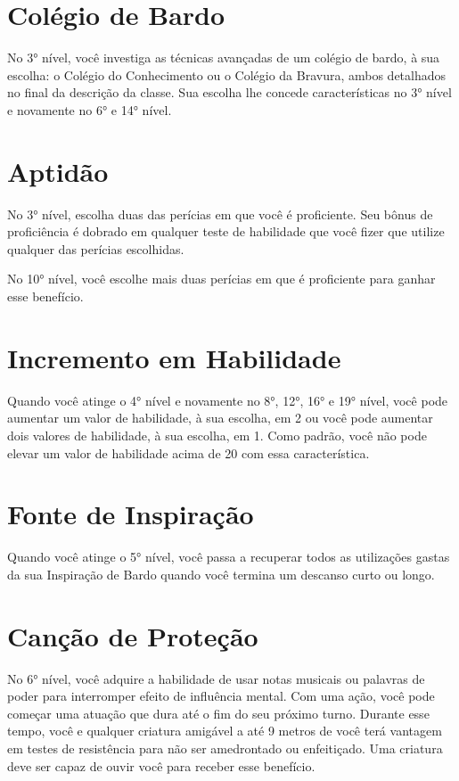 \begin{multicols}{2}
\section*{Colégio de Bardo}%

No 3° nível, você investiga as técnicas avançadas de um colégio de bardo, à sua
escolha: o Colégio do Conhecimento ou o Colégio da Bravura, ambos detalhados no
final da descrição da classe. Sua escolha lhe concede características no 3°
nível e novamente no 6° e 14° nível.

\section*{Aptidão}%

No 3° nível, escolha duas das perícias em que você é proficiente. Seu bônus de
proficiência é dobrado em qualquer teste de habilidade que você fizer que
utilize qualquer das perícias escolhidas.

No 10° nível, você escolhe mais duas perícias em que é proficiente para ganhar
esse benefício.

\section*{Incremento em Habilidade}%

Quando você atinge o 4° nível e novamente no 8°, 12°, 16° e 19° nível, você pode
aumentar um valor de habilidade, à sua escolha, em 2 ou você pode aumentar dois
valores de habilidade, à sua escolha, em 1. Como padrão, você não pode elevar um
valor de habilidade acima de 20 com essa característica.

\section*{Fonte de Inspiração}%

Quando você atinge o 5° nível, você passa a recuperar todos as utilizações
gastas da sua Inspiração de Bardo quando você termina um descanso curto ou
longo.

\section*{Canção de Proteção}%

No 6° nível, você adquire a habilidade de usar notas musicais ou palavras de
poder para interromper efeito de influência mental. Com uma ação, você pode
começar uma atuação que dura até o fim do seu próximo turno. Durante esse tempo,
você e qualquer criatura amigável a até 9 metros de você terá vantagem em testes
de resistência para não ser amedrontado ou enfeitiçado. Uma criatura deve ser
capaz de ouvir você para receber esse benefício.


\end{multicols}
